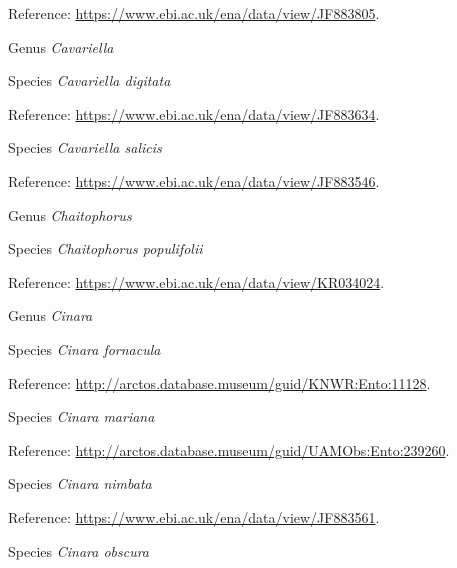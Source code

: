 \documentclass[9pt, article]{memoir}
\begin{document}
\begin{multicols}{2}
Reference: 
\url{https://www.ebi.ac.uk/ena/data/view/JF883805}.

\vspace{6pt}\noindent\hspace{30pt}Genus \textit{Cavariella}


\vspace{6pt}\noindent\hspace{36pt}Species \textit{Cavariella digitata}


Reference: 
\url{https://www.ebi.ac.uk/ena/data/view/JF883634}.

\vspace{6pt}\noindent\hspace{36pt}Species \textit{Cavariella salicis}


Reference: 
\url{https://www.ebi.ac.uk/ena/data/view/JF883546}.

\vspace{6pt}\noindent\hspace{30pt}Genus \textit{Chaitophorus}


\vspace{6pt}\noindent\hspace{36pt}Species \textit{Chaitophorus populifolii}


Reference: 
\url{https://www.ebi.ac.uk/ena/data/view/KR034024}.

\vspace{6pt}\noindent\hspace{30pt}Genus \textit{Cinara}


\vspace{6pt}\noindent\hspace{36pt}Species \textit{Cinara fornacula}


Reference: 
\url{http://arctos.database.museum/guid/KNWR:Ento:11128}.

\vspace{6pt}\noindent\hspace{36pt}Species \textit{Cinara mariana}


Reference: 
\url{http://arctos.database.museum/guid/UAMObs:Ento:239260}.

\vspace{6pt}\noindent\hspace{36pt}Species \textit{Cinara nimbata}


Reference: 
\url{https://www.ebi.ac.uk/ena/data/view/JF883561}.

\vspace{6pt}\noindent\hspace{36pt}Species \textit{Cinara obscura}



\end{multicols}
\end{document}
